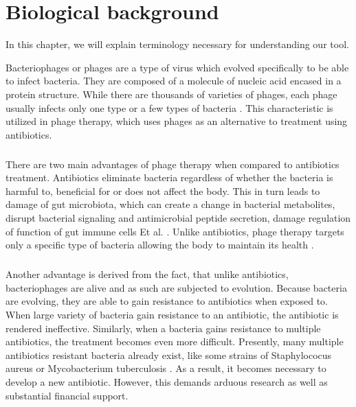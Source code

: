 \chapter{Biological background}

\label{kap:background} %

In this chapter, we will explain terminology necessary for understanding our tool.

Bacteriophages or phages are a type of virus which evolved specifically to be able to infect bacteria. They are composed of a molecule of nucleic acid encased in a protein structure. While there are thousands of varieties of phages, each phage usually infects only one type or a few types of bacteria \cite{guttman2005basic}. This characteristic is utilized in phage therapy, which uses phages as an alternative to treatment using antibiotics. 
\paragraph*{}
There are two main advantages of phage therapy \cite{lin2017phage} when compared to antibiotics treatment. Antibiotics eliminate bacteria regardless of whether the bacteria is harmful to, beneficial for or does not affect the body. This in turn leads to damage of gut microbiota, which can create a change in bacterial metabolites, disrupt bacterial signaling and antimicrobial peptide secretion, damage regulation of function of gut immune cells Et al. \cite{zhang2019facing}. Unlike antibiotics, phage therapy targets only a specific type of bacteria allowing the body to maintain its health \cite{lin2017phage}. 
\paragraph*{}
Another advantage is derived from the fact, that unlike antibiotics, bacteriophages are alive and as such are subjected to evolution. Because bacteria are evolving, they are able to gain resistance to antibiotics when exposed to. When large variety of bacteria gain resistance to an antibiotic, the antibiotic is rendered ineffective. Similarly, when a bacteria gains resistance to multiple antibiotics, the treatment becomes even more difficult. Presently, many multiple antibiotics resistant bacteria already exist, like some strains of Staphylococus aureus or Mycobacterium tuberculosis \cite{guilfoile2007antibiotic}. As a result, it becomes necessary to develop a new antibiotic. However, this demands arduous research as well as substantial financial support. 
